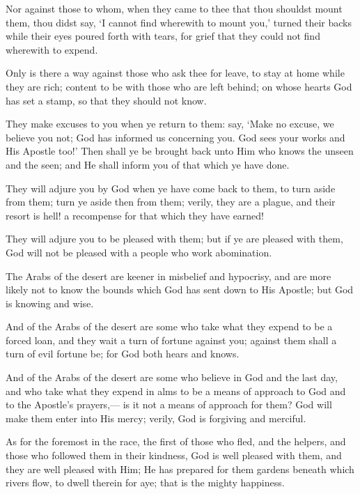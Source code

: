 \documentclass[fontsize=14pt, letterpaper, notitlepage, openany, DIV=12]{scrbook} %
\begin{document}
\noindent[9:92]
Nor against those to whom, when they came to thee that thou shouldst mount them, thou
didst say, `I cannot find wherewith to mount you,' turned their backs while their eyes poured
forth with tears, for grief that they could not find wherewith to expend.

\noindent[9:93]
Only is there a way against those who ask thee for leave, to stay at home while they are
rich; content to be with those who are left behind; on whose hearts God has set a stamp, so that
they should not know.

\noindent[9:94]
They make excuses to you when ye return to them: say, `Make no excuse, we believe you
not; God has informed us concerning you. God sees your works and His Apostle too!' Then shall
ye be brought back unto Him who knows the unseen and the seen; and He shall inform you of
that which ye have done.

\noindent[9:95]
They will adjure you by God when ye have come back to them, to turn aside from them;
turn ye aside then from them; verily, they are a plague, and their resort is hell! a recompense for
that which they have earned!

\noindent[9:96]
They will adjure you to be pleased with them; but if ye are pleased with them, God will
not be pleased with a people who work abomination.

\noindent[9:97]
The Arabs of the desert are keener in misbelief and hypocrisy, and are more likely not to
know the bounds which God has sent down to His Apostle; but God is knowing and wise.

\noindent[9:98]
And of the Arabs of the desert are some who take what they expend to be a forced loan,
and they wait a turn of fortune against you; against them shall a turn of evil fortune be; for God
both hears and knows.

\noindent[9:99]
And of the Arabs of the desert are some who believe in God and the last day, and who
take what they expend in alms to be a means of approach to God and to the Apostle's prayers,---
is it not a means of approach for them? God will make them enter into His mercy; verily, God is
forgiving and merciful.

\noindent[9:100]
As for the foremost in the race, the first of those who fled, and the helpers, and those who
followed them in their kindness, God is well pleased with them, and they are well pleased with
Him; He has prepared for them gardens beneath which rivers flow, to dwell therein for aye; that
is the mighty happiness.
\end{document}
